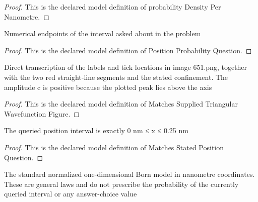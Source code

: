 \begin{proof}
  This is the declared model definition of probability Density Per Nanometre.
\end{proof}
\begin{definition}
  \label{def:physics:phyx-mini-0651:phyxminiproblems-problemphyxmini0651-positionprobabilityquestion}
  Numerical endpoints of the interval asked about in the problem
\end{definition}
\begin{proof}
  This is the declared model definition of Position Probability Question.
\end{proof}
\begin{definition}
  \label{def:physics:phyx-mini-0651:phyxminiproblems-problemphyxmini0651-matchessuppliedtriangularwavefunctionfigure}
  Direct transcription of the labels and tick locations in image 651.png, together with the two red straight-line segments and the stated confinement. The amplitude c is positive because the plotted peak lies above the axis
\end{definition}
\begin{proof}
  This is the declared model definition of Matches Supplied Triangular Wavefunction Figure.
\end{proof}
\begin{definition}
  \label{def:physics:phyx-mini-0651:phyxminiproblems-problemphyxmini0651-matchesstatedpositionquestion}
  The queried position interval is exactly 0 nm ≤ x ≤ 0.25 nm
\end{definition}
\begin{proof}
  This is the declared model definition of Matches Stated Position Question.
\end{proof}
\begin{definition}
  \label{def:physics:phyx-mini-0651:phyxminiproblems-problemphyxmini0651-satisfiesnormalizedbornmodel}
  The standard normalized one-dimensional Born model in nanometre coordinates. These are general laws and do not prescribe the probability of the currently queried interval or any answer-choice value
\end{definition}
